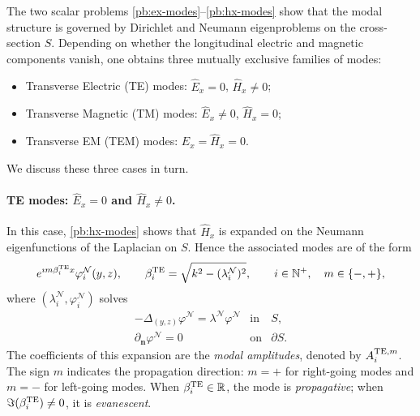 \documentclass[smallextended]{svjour3}       %
\begin{document}
The two scalar problems \eqref{pb:ex-modes}--\eqref{pb:hx-modes} show that the modal structure is governed by Dirichlet and Neumann eigenproblems on the cross-section $S$. Depending on whether the longitudinal electric and magnetic components vanish, one obtains three mutually exclusive families of modes:
\begin{itemize}
\item Transverse Electric (TE) modes: $\widehat E_x=0$, $\widehat H_x\neq 0$;
\item Transverse Magnetic (TM) modes: $\widehat E_x\neq 0$, $\widehat H_x=0$;
\item Transverse EM (TEM) modes: $\widehat E_x=\widehat H_x=0$.
\end{itemize}
We discuss these three cases in turn.

\paragraph{TE modes: $\widehat E_x=0$ and $\widehat H_x\neq 0$.}
In this case, \eqref{pb:hx-modes} shows that $\widehat H_x$ is expanded on the Neumann eigenfunctions of the Laplacian on $S$. Hence the associated modes are of the form
\[
e^{\imath m\beta_i^{\rm TE}x}\varphi_i^{\mathcal N}(y,z),
\qquad
\beta_i^{\rm TE}=\sqrt{k^2-(\lambda_i^{\mathcal N})^2},
\qquad i\in\mathbb N^+,\quad m\in\{-,+\},
\]
where $(\lambda_i^{\mathcal N},\varphi_i^{\mathcal N})$ solves
\begin{equation}
\label{eq:ev}
\begin{array}{|lll}
-\Delta_{(y,z)}\varphi^{\mathcal N} = \lambda^{\mathcal N}\varphi^{\mathcal N} & \text{in} & S,\\[3pt]
\partial_{\mathbf n}\varphi^{\mathcal N}=0 & \text{on} & \partial S.
\end{array}
\end{equation}
The coefficients of this expansion are the \emph{modal amplitudes}, denoted by $A_i^{{\rm TE},m}$. The sign $m$ indicates the propagation direction: $m=+$ for right-going modes and $m=-$ for left-going modes. When $\beta_i^{\rm TE}\in\mathbb R$, the mode is \emph{propagative}; when $\Im(\beta_i^{\rm TE})\neq 0$, it is \emph{evanescent}.
\end{document}
